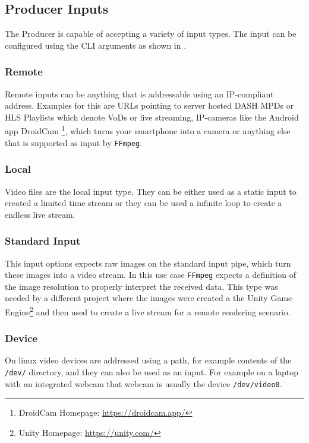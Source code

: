 \subsection{Producer Inputs\label{sec:producer_inputs}}

The Producer is capable of accepting a variety of input types. The input can be configured using the CLI arguments as shown in .

\subsubsection{Remote}

Remote inputs can be anything that is addressable using an IP-compliant address. Examples for this are URLs pointing to server hosted DASH MPDs or HLS Playlists which denote VoDs or live streaming, IP-cameras like the Android app DroidCam \footnote{DroidCam Homepage: \url{https://droidcam.app/}}, which turns your smartphone into a camera or anything else that is supported as input by \texttt{FFmpeg}.

\subsubsection{Local}

Video files are the local input type. They can be either used as a static input to created a limited time stream or they can be used a infinite loop to create a endless live stream.

\subsubsection{Standard Input}

This input options expects raw images on the standard input pipe, which turn these images into a video stream. In this use case \texttt{FFmpeg} expects a definition of the image resolution to properly interpret the received data. This type was needed by a different project where the images were created a the Unity Game Engine\footnote{Unity Homepage: \url{https://unity.com/}} and then used to create a live stream for a remote rendering scenario.

\subsubsection{Device}

On linux video devices are addressed using a path, for example contents of the \texttt{/dev/} directory, and they can also be used as an input. For example on a laptop with an integrated webcam that webcam is usually the device \texttt{/dev/video0}.

